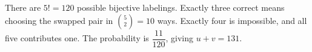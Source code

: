 There are $5!=120$ possible bijective labelings. Exactly three correct means choosing the swapped pair in $\binom52=10$ ways. Exactly four is impossible, and all five contributes one. The probability is $\dfrac{11}{120}$, giving $u+v=\boxed{131}$.
